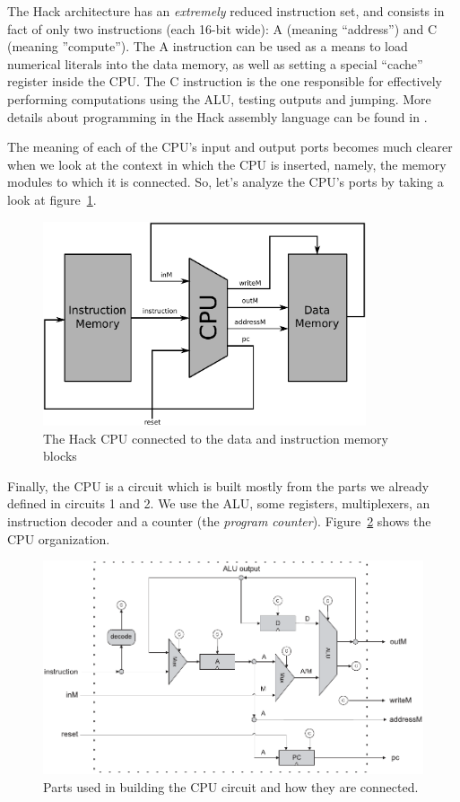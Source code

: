         The Hack architecture has an \emph{extremely} reduced instruction set, and consists in fact
        of only two instructions (each 16-bit wide): A (meaning ``address'') and C (meaning
        ''compute''). The A instruction can be used as a means to load numerical literals into the
        data memory, as well as setting a special ``cache'' register inside the CPU. The C
        instruction is the one responsible for effectively performing computations using the ALU,
        testing outputs and jumping. More details about programming in the Hack assembly language
        can be found in \cite{nand2tetris-chapter-assembly}.

        The meaning of each of the CPU's input and output ports becomes much clearer when we look at
        the context in which the CPU is inserted, namely, the memory modules to which it is
        connected. So, let's analyze the CPU's ports by taking a look at figure~\ref{fig:cpu-memory}.

        \begin{figure}[h!]
            \centerline{\includegraphics[width=0.85\textwidth]{imgs/cpu-memory.pdf}}
            \caption{The Hack CPU connected to the data and instruction memory blocks
                \label{fig:cpu-memory}}
        \end{figure}

        Finally, the CPU is a circuit which is built mostly from the parts we already defined in
        circuits 1 and 2. We use the ALU, some registers, multiplexers, an instruction decoder and a
        counter (the \emph{program counter}). Figure~\ref{fig:cpu-parts} shows the CPU organization.

        \begin{figure}[h!]
            \centerline{\includegraphics[width=1.0\textwidth]{imgs/cpu-parts.pdf}}
            \caption{Parts used in building the CPU circuit and how they are connected.
                \label{fig:cpu-parts}}
        \end{figure}
